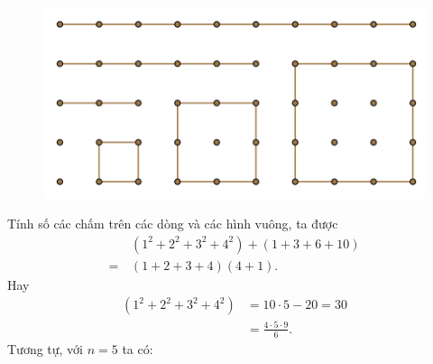 \begin{multicols}{2}
\begin{figure}[H]
		\vspace*{-5pt}
		\centering
		\captionsetup{labelformat= empty, justification=centering}
		\includegraphics[width= 1\linewidth]{11}
		\vspace*{-5pt}
	\end{figure}
	Tính số các chấm trên các dòng và các hình vuông, ta được
	\begin{align*}
			&\left( {{1^2} + {2^2} + {3^2} + {4^2}} \right) + \left( {1 + 3 + 6 + 10} \right)\\
			= \,&\left( {1 + 2 + 3 + 4} \right)\left( {4 + 1} \right).
	\end{align*}
	Hay
	\begin{align*}
		\left( {{1^2} + {2^2} + {3^2} + {4^2}} \right) &= 10 \cdot 5 - 20 = 30 \\
		&= \frac{{4 \cdot 5 \cdot 9}}{6}.
	\end{align*}
	Tương tự, với $n=5$   ta có:
	\begin{figure}[H]
		\vspace*{-10pt}
		\centering
		\captionsetup{labelformat= empty, justification=centering}

\end{figure}
\end{multicols}
